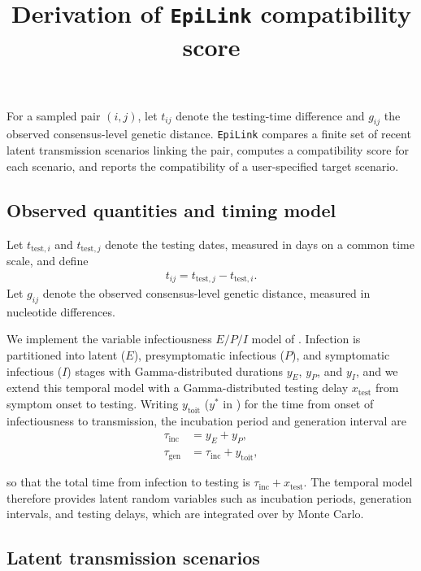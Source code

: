 \documentclass[10pt,a4paper]{article}
\title{Derivation of \texttt{EpiLink} compatibility score}
\author{}
\date{}
\begin{document}
\maketitle

For a sampled pair $(i,j)$, let $t_{ij}$ denote the testing-time difference and $g_{ij}$ the observed consensus-level genetic distance. \texttt{EpiLink} compares a finite set of recent latent transmission scenarios linking the pair, computes a compatibility score for each scenario, and reports the compatibility of a user-specified target scenario.

\subsection*{Observed quantities and timing model}

Let $t_{\mathrm{test},i}$ and $t_{\mathrm{test},j}$ denote the testing dates, measured in days on a common time scale, and define
\begin{align}
    t_{ij} = t_{\mathrm{test},j} - t_{\mathrm{test},i}.
\end{align}
Let $g_{ij}$ denote the observed consensus-level genetic distance, measured in nucleotide differences.

We implement the variable infectiousness $E/P/I$ model of \citet{Hart2021}. Infection is partitioned into latent ($E$), presymptomatic infectious ($P$), and symptomatic infectious ($I$) stages with Gamma-distributed durations $y_E$, $y_P$, and $y_I$, and we extend this temporal model with a Gamma-distributed testing delay $x_{\mathrm{test}}$ from symptom onset to testing. Writing $y_\mathrm{toit}$ ($y^*$ in \citet{Hart2021}) for the time from onset of infectiousness to transmission, the incubation period and generation interval are
\begin{align}
    \tau_{\mathrm{inc}} &= y_E + y_P,\\
    \tau_{\mathrm{gen}} &= \tau_{\mathrm{inc}} + y_\mathrm{toit},
\end{align}

so that the total time from infection to testing is $\tau_{\mathrm{inc}} + x_{\mathrm{test}}$. The temporal model therefore provides latent random variables such as incubation periods, generation intervals, and testing delays, which are integrated over by Monte Carlo.

\subsection*{Latent transmission scenarios}
\end{document}
